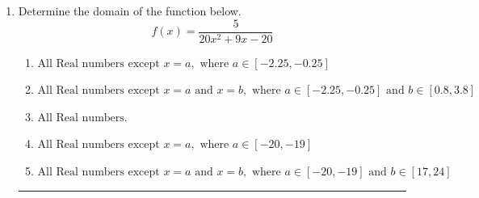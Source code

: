 \documentclass[14pt]{extbook}
\newcommand{\litem}[1]{\item#1\hspace*{-1cm}\rule{\textwidth}{0.4pt}}
\begin{document}
\begin{enumerate}
{\begin{enumerate}[label=\Alph*.]
\end{enumerate} }
\litem{
Determine the domain of the function below.\[ f(x) = \frac{5}{20x^{2} +9 x -20} \]\begin{enumerate}[label=\Alph*.]
\item \( \text{All Real numbers except } x = a, \text{ where } a \in [-2.25, -0.25] \)
\item \( \text{All Real numbers except } x = a \text{ and } x = b, \text{ where } a \in [-2.25, -0.25] \text{ and } b \in [0.8, 3.8] \)
\item \( \text{All Real numbers.} \)
\item \( \text{All Real numbers except } x = a, \text{ where } a \in [-20, -19] \)
\item \( \text{All Real numbers except } x = a \text{ and } x = b, \text{ where } a \in [-20, -19] \text{ and } b \in [17, 24] \)


\end{enumerate}}
\end{enumerate}
\end{document}
